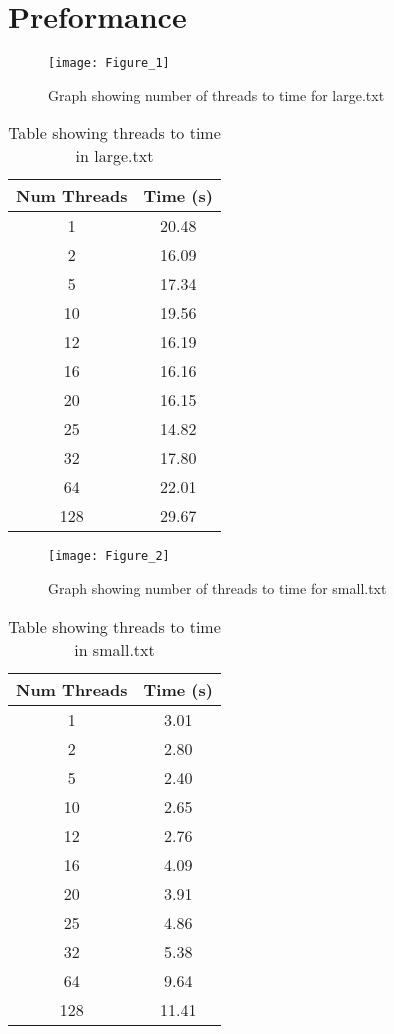 \documentclass[12pt]{article}
\begin{document}
\section{Preformance}

\begin{figure}[H]
\texttt{[image: Figure\_1]}
\caption{Graph showing number of threads to time for large.txt}
\end{figure}

\begin{table}[H]
\caption{Table showing threads to time in large.txt}
\begin{center}
\begin{tabular}{||c | c||}
 \hline
 Num Threads & Time (s) \\
 \hline
 1 & 20.48\\
 2 & 16.09\\
 5 & 17.34\\
 10 & 19.56\\
 12 & 16.19\\
 16 & 16.16\\
 20 & 16.15\\
 25 & 14.82\\
 32 & 17.80\\
 64 & 22.01\\
 128 & 29.67\\
 \hline
\end{tabular}
\end{center}
\end{table}

\begin{figure}[H]
\texttt{[image: Figure\_2]}
\caption{Graph showing number of threads to time for small.txt}
\end{figure}

\begin{table}[H]
\caption{Table showing threads to time in small.txt}
\begin{center}
\begin{tabular}{||c | c||}
 \hline
 Num Threads & Time (s) \\
 \hline
 1 & 3.01\\
 2 & 2.80\\
 5 & 2.40\\
 10 & 2.65\\
 12 & 2.76\\
 16 & 4.09\\
 20 & 3.91\\
 25 & 4.86\\
 32 & 5.38\\
 64 & 9.64\\
 128 & 11.41\\
 \hline
\end{tabular}
\end{center}
\end{table}
\end{document}

